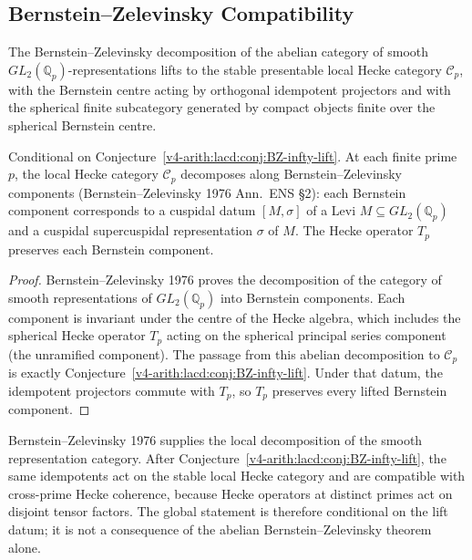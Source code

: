 \subsection{Bernstein--Zelevinsky Compatibility}

\begin{conjecture}
\label{v4-arith:lacd:conj:BZ-infty-lift}
The Bernstein--Zelevinsky decomposition of the
abelian category of smooth \(GL_{2}(\mathbb{Q}_{p})\)-representations
lifts to the stable presentable local Hecke category
\(\mathcal C_p\), with the Bernstein centre acting by orthogonal
idempotent projectors and with the spherical finite subcategory
generated by compact objects finite over the spherical Bernstein
centre.
\end{conjecture}

\begin{proposition}
\label{v4-arith:lacd:prop:BZ-compat}
Conditional on
Conjecture~\ref{v4-arith:lacd:conj:BZ-infty-lift}. At each finite prime \(p\), the local Hecke
category \(\mathcal{C}_{p}\) decomposes along Bernstein--Zelevinsky
components (Bernstein--Zelevinsky 1976 Ann.\ ENS \S2): each
Bernstein component corresponds to a cuspidal datum
\([M, \sigma]\) of a Levi \(M \subseteq GL_{2}(\mathbb{Q}_{p})\) and
a cuspidal supercuspidal representation \(\sigma\) of \(M\). The Hecke
operator \(T_{p}\) preserves each Bernstein component.
\end{proposition}

\begin{proof}
Bernstein--Zelevinsky 1976 proves the decomposition of the category
of smooth representations of \(GL_{2}(\mathbb{Q}_{p})\) into
Bernstein components. Each component is invariant under the
centre of the Hecke algebra, which includes the spherical Hecke
operator \(T_{p}\) acting on the spherical principal series
component (the unramified component). The passage from this abelian
decomposition to \(\mathcal C_p\) is exactly
Conjecture~\ref{v4-arith:lacd:conj:BZ-infty-lift}. Under that datum, the
idempotent projectors commute with \(T_p\), so \(T_p\) preserves every
lifted Bernstein component.
\end{proof}

\begin{remark}
\label{v4-arith:lacd:rem:BZ-role}
Bernstein--Zelevinsky 1976 supplies the local decomposition of the
smooth representation category. After
Conjecture~\ref{v4-arith:lacd:conj:BZ-infty-lift}, the same idempotents act on
the stable local Hecke category and are compatible with cross-prime
Hecke coherence, because Hecke operators at distinct primes act on
disjoint tensor factors. The global statement is therefore conditional
on the lift datum; it is not a consequence of the abelian
Bernstein--Zelevinsky theorem alone.
\end{remark}

